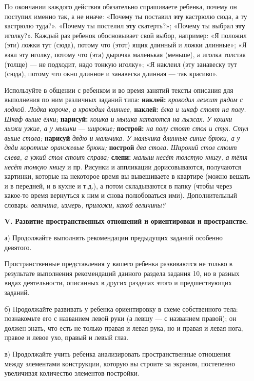 \documentclass{book}
\renewcommand{\emph}[1]{\textit{#1}}
\begin{document}
По окончании каждого действия обязательно спрашиваете ребенка, почему он
поступил именно так, а не иначе: «Почему ты поставил \textbf{эту}
кастрюлю сюда, а ту кастрюлю туда?». «Почему ты постелил \textbf{эту}
скатерть?»; «Почему ты выбрал \textbf{эту} иголку?». Каждый раз ребенок
обосновывает свой выбор, например: «Я положил (эти) ложки тут (сюда),
потому что (этот) ящик длинный и ложки длинные»; «Я взял эту иголку,
потому что (эта) дырочка маленькая (меньше), а иголка толстая (толще)
--- не подходит, надо тонкую иголку»; «Я наклеил (эту занавеску тут
(сюда), потому что окно длинное и занавеска длинная --- так красиво».

Используйте в общении с ребенком и во время занятий тексты описания для
выполнения по ним различных заданий типа: \textbf{наклей:}
\emph{крокодил лежит рядом с лодкой. Лодка короче, а крокодил длиннее,}
\textbf{наклей:} \emph{ёлка и шкаф стоят на полу. Шкаф выше ёлки;}
\textbf{нарисуй:} \emph{кошка и мышка катаются на лыжах. У кошки лыжи
узкие, а у мышки} --- \emph{широкие;} \textbf{построй:} \emph{на полу
стоят стол и стул. Стул выше стола;} \textbf{нарисуй} \emph{дядю и
мальчика. У мальчика длинные синие брюки, а у дяди короткие оранжевые
брюки;} \textbf{построй} \emph{два стола. Широкий стол стоит слева, а
узкий стол стоит справа;} \textbf{слепи:} \emph{малыш несёт толстую
книгу, а тётя несёт тонкую книгу} и пр. Рисунки и аппликации
дорисовываются, получаются картинки, которые на некоторое время вы
вывешиваете в квартире (можно вешать и в передней, и в кухне и т.д.), а
потом складываются в папку (чтобы через какое-то время вернуться к ним и
снова полюбоваться ими). Дополнительный словарь: \emph{величина, измерь,
приложи, какой величины?}

\textbf{V. Развитие пространственных отношений и ориентировки и
пространстве.}

а) Продолжайте выполнять рекомендации предыдущих заданий особенно
девятого.

Пространственные представления у вашего ребенка развиваются не только в
результате выполнения рекомендаций данного раздела задания 10, но в
разных видах деятельности, описанных в других разделах этого и
предшествующих заданий.

б) Продолжайте развивать у ребенка ориентировку в схеме собственного
тела: познакомьте его с названием левой руки (а левшу --- с названием
правой); он должен знать, что есть не только правая и левая рука, но и
правая и левая нога, правое и левое ухо, правый и левый глаз.

в) Продолжайте учить ребенка анализировать пространственные отношения
между элементами конструкции, которую вы строите за экраном, постепенно
увеличивая количество элементов постройки.
\end{document}
